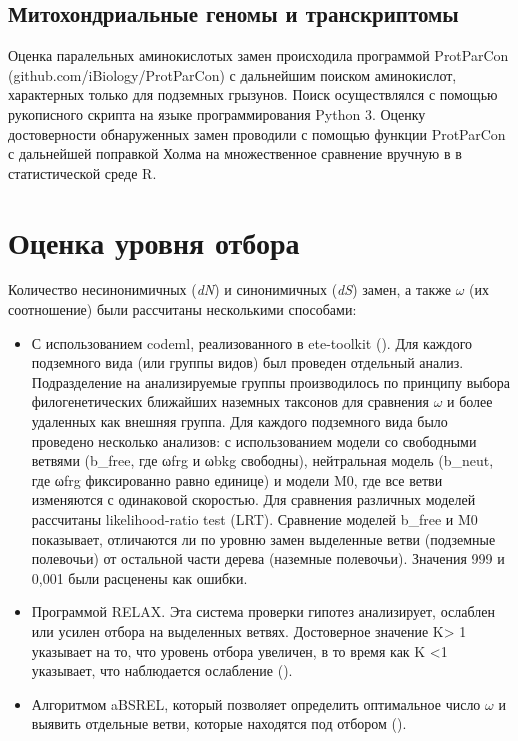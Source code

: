 \subsection{Митохондриальные геномы и транскриптомы}

Оценка паралельных аминокислотых замен происходила программой ProtParCon (github.com/iBiology/ProtParCon) с дальнейшим поиском аминокислот, характерных только для подземных грызунов. Поиск осуществлялся с помощью рукописного скрипта на языке программирования Python 3. Оценку достоверности обнаруженных замен проводили с помощью функции ProtParCon с дальнейшей поправкой Холма на множественное сравнение вручную в в статистической среде R.  

\section{Оценка уровня отбора}

Количество несинонимичных (\textit{dN}) и синонимичных (\textit{dS}) замен, а также $\omega$ (их соотношение) были рассчитаны несколькими способами: 
\begin{itemize}
	\item[\textbullet] С использованием codeml, реализованного в ete-toolkit (\cite{Huerta-Cepas2016}). Для каждого подземного вида (или группы видов) был проведен отдельный анализ. Подразделение на анализируемые группы производилось по принципу выбора филогенетических ближайших наземных таксонов для сравнения $\omega$ и более удаленных как внешняя группа. Для каждого подземного вида было проведено несколько анализов: с использованием модели со свободными ветвями (b\_free, где ωfrg и ωbkg свободны), нейтральная модель (b\_neut, где ωfrg фиксированно равно единице) и модели M0, где все ветви изменяются с одинаковой скоростью. Для сравнения различных моделей рассчитаны likelihood-ratio test (LRT). Сравнение моделей b\_free и M0 показывает, отличаются ли по уровню замен выделенные ветви (подземные полевочьи) от остальной части дерева (наземные полевочьи). Значения 999 и 0,001 были расценены как ошибки.
	\item[\textbullet] Программой RELAX. Эта система проверки гипотез анализирует, ослаблен или усилен отбора на выделенных ветвях. Достоверное значение K> 1 указывает на то, что уровень отбора увеличен, в то время как K <1 указывает, что наблюдается ослабление (\cite{Wertheim2015}).
	\item[\textbullet] Алгоритмом aBSREL, который позволяет определить оптимальное число $\omega$ и выявить отдельные ветви, которые находятся под отбором (\cite{Smith2015}).     
\end{itemize}


